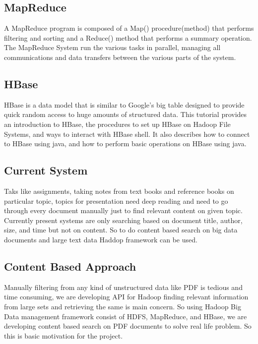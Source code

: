 \documentclass{IEEEtran}
\begin{document}
\subsection{MapReduce}
A MapReduce program is composed of a Map() procedure(method) that performs filtering and sorting and a Reduce() method that performs a summary operation. The MapReduce System run the various tasks in parallel, managing all communications and data transfers between the various parts of the system.

\subsection{HBase}
HBase is a data model that is similar to Google’s big table designed to provide quick random access to huge amounts of structured data. This tutorial provides an introduction to HBase, the procedures to set up HBase on Hadoop File Systems, and ways to interact with HBase shell. It also describes how to connect to HBase using java, and how to perform basic operations on HBase using java.

\subsection{Current System}
Taks like assignments, taking notes from text books and reference books on particular topic, topics for presentation need deep reading and need to go through every document manually just to find relevant content on given topic.
Currently present systems are only searching based on document title, author, size, and time but not on content. So to do content based search on big data documents and large text data Haddop framework can be used.

\subsection{Content Based Approach}
Manually filtering from any kind of unstructured data like PDF is tedious and time consuming, we are developing API for Hadoop finding relevant information from large sets and retrieving the same is main concern. So using Hadoop Big Data management framework consist of HDFS, MapReduce, and HBase, we are developing content based search on PDF documents to solve real life problem. So this is basic motivation for the project.
\end{document}
